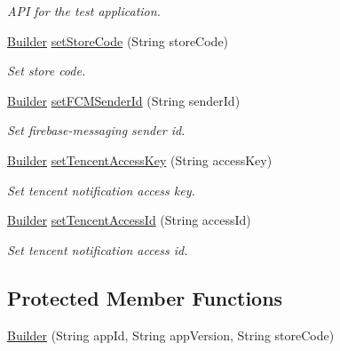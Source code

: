 \begin{DoxyCompactItemize}
\begin{DoxyCompactList}\small\item\em A\+PI for the test application. \end{DoxyCompactList}\item 
\hyperlink{classcom_1_1toast_1_1android_1_1gamebase_1_1_gamebase_configuration_1_1_builder}{Builder} \hyperlink{classcom_1_1toast_1_1android_1_1gamebase_1_1_gamebase_configuration_1_1_builder_a10964576edd072e214ed8edcd1e7baf8}{set\+Store\+Code} (String store\+Code)
\begin{DoxyCompactList}\small\item\em Set store code. \end{DoxyCompactList}\item 
\hyperlink{classcom_1_1toast_1_1android_1_1gamebase_1_1_gamebase_configuration_1_1_builder}{Builder} \hyperlink{classcom_1_1toast_1_1android_1_1gamebase_1_1_gamebase_configuration_1_1_builder_aa042e4ff4f1dd7038b615dec2d8e4e69}{set\+F\+C\+M\+Sender\+Id} (String sender\+Id)
\begin{DoxyCompactList}\small\item\em Set firebase-\/messaging sender id. \end{DoxyCompactList}\item 
\hyperlink{classcom_1_1toast_1_1android_1_1gamebase_1_1_gamebase_configuration_1_1_builder}{Builder} \hyperlink{classcom_1_1toast_1_1android_1_1gamebase_1_1_gamebase_configuration_1_1_builder_ac172551b643355d3ff300fca51c4bd50}{set\+Tencent\+Access\+Key} (String access\+Key)
\begin{DoxyCompactList}\small\item\em Set tencent notification access key. \end{DoxyCompactList}\item 
\hyperlink{classcom_1_1toast_1_1android_1_1gamebase_1_1_gamebase_configuration_1_1_builder}{Builder} \hyperlink{classcom_1_1toast_1_1android_1_1gamebase_1_1_gamebase_configuration_1_1_builder_a2b5790c8f47b6ed51ff69b9830ca5a2d}{set\+Tencent\+Access\+Id} (String access\+Id)
\begin{DoxyCompactList}\small\item\em Set tencent notification access id. \end{DoxyCompactList}\end{DoxyCompactItemize}
\subsection*{Protected Member Functions}
\begin{DoxyCompactItemize}
\item 
\hyperlink{classcom_1_1toast_1_1android_1_1gamebase_1_1_gamebase_configuration_1_1_builder_ab8dce20a5e0f4a689574d947e05a4feb}{Builder} (String app\+Id, String app\+Version, String store\+Code)
\end{DoxyCompactItemize}
